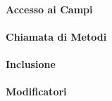 \paragraph{Accesso ai Campi}

\paragraph{Chiamata di Metodi}

\paragraph{Inclusione}

\paragraph{Modificatori}
